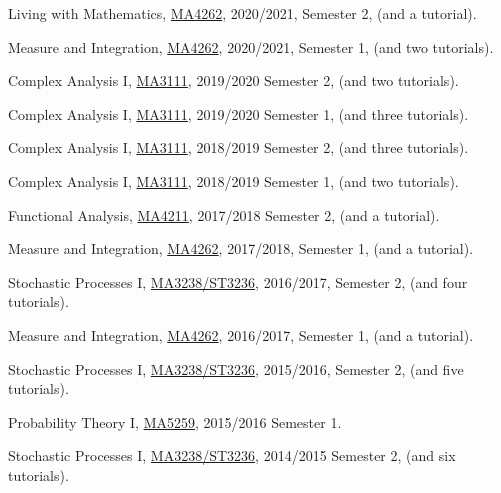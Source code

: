 \begin{item_list}
\item
  Living with Mathematics, \href{https://wangd-math.github.io/teaching/GEH1036_GEK1505_S21/index.html}{MA4262}, 2020/2021, Semester 2, (and a tutorial).
\item
  Measure and Integration, \href{https://wangd-math.github.io/teaching/MA4262_F20/index.html}{MA4262}, 2020/2021, Semester 1, (and two tutorials).
\item
  Complex Analysis I, \href{https://wangd-math.github.io/teaching/MA3111_S20/index.html}{MA3111}, 2019/2020 Semester 2, (and two tutorials).
\item
  Complex Analysis I, \href{https://wangd-math.github.io/teaching/MA3111_F19/index.html}{MA3111}, 2019/2020 Semester 1, (and three tutorials).
\item
  Complex Analysis I, \href{https://wangd-math.github.io/teaching/MA3111_S19/index.html}{MA3111}, 2018/2019 Semester 2, (and three tutorials).
\item
  Complex Analysis I, \href{https://wangd-math.github.io/teaching/MA3111_F18/index.html}{MA3111}, 2018/2019 Semester 1, (and two tutorials).
\item
  Functional Analysis, \href{https://wangd-math.github.io/teaching/MA4211_S18/index.html}{MA4211}, 2017/2018 Semester 2, (and a tutorial).
\item
  Measure and Integration, \href{https://wangd-math.github.io/teaching/MA4262_F17/index.html}{MA4262}, 2017/2018, Semester 1, (and a tutorial).
\item
  Stochastic Processes I, \href{https://wangd-math.github.io/teaching/MA3238_ST3236_S17/index.html}{MA3238/ST3236}, 2016/2017, Semester 2, (and four tutorials).
\item
  Measure and Integration, \href{https://wangd-math.github.io/teaching/MA4262_F16/index.html}{MA4262}, 2016/2017, Semester 1, (and a tutorial).
\item
  Stochastic Processes I, \href{https://wangd-math.github.io/teaching/MA3238_ST3236_S16/index.html}{MA3238/ST3236}, 2015/2016, Semester 2, (and five tutorials).
\item
  Probability Theory I, \href{https://wangd-math.github.io/teaching/MA5259_F15/index.html}{MA5259}, 2015/2016 Semester 1.
\item
  Stochastic Processes I, \href{https://wangd-math.github.io/teaching/MA3238_ST3236_S15/index.html}{MA3238/ST3236}, 2014/2015 Semester 2, (and six tutorials).
\item

\end{item_list}
